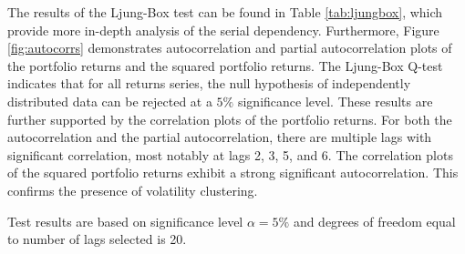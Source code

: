 \documentclass[a4paper,12pt]{article}
\theoremstyle{plain}
\begin{document}
The results of the Ljung-Box test can be found in Table \ref{tab:ljungbox}, which provide more in-depth analysis of the serial dependency. Furthermore, Figure \ref{fig:autocorrs} demonstrates autocorrelation and partial autocorrelation plots of the portfolio returns and the squared portfolio returns. The Ljung-Box Q-test indicates that for all returns series, the null hypothesis of independently distributed data can be rejected at a $5\%$ significance level. These results are further supported by the correlation plots of the portfolio returns. For both the autocorrelation and the partial autocorrelation, there are multiple lags with significant correlation, most notably at lags 2, 3, 5, and 6. The correlation plots of the squared portfolio returns exhibit a strong significant autocorrelation. This confirms the presence of volatility clustering.
\newpage

\begin{table}[H]
\captionsetup{width=.9\textwidth}
\caption{Ljung-Box Q-test results.} 
\centering
\label{tab:ljungbox}
\begin{tablenotes}
      \tiny
      \item * Test results are based on significance level $\alpha=5\%$ and degrees of freedom equal to number of lags selected is 20.
\end{tablenotes}
\end{table}
\end{document}
